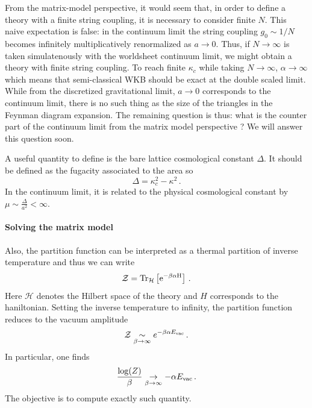 \documentclass[a4paper]{article}
\begin{document}
From the matrix-model perspective, it would seem that, in order to define a theory with a finite string coupling, it is necessary to consider finite $N$. This naive expectation is false: in the continuum limit the string coupling $g_0\sim 1/N$ becomes infinitely multiplicatively renormalized as $a\to0$. Thus, if $N\to \infty$ is taken simulatenously with the worldsheet continuum limit, we might obtain a theory with finite string coupling. To reach finite $\kappa_c$ while taking $N\to \infty$, $\alpha\to \infty$ which means that semi-classical WKB should be exact at the double scaled limit. While from the discretized gravitational limit, $a\to0$ corresponds to the continuum limit, there is no such thing as the size of the triangles in the Feynman diagram expansion. The remaining question is thus: what is the counter part of the continuum limit from the matrix model perspective ? We will answer this question soon. 

A useful quantity to define is the bare lattice cosmological constant $\Delta$. It should be defined as the fugacity associated to the area so
\begin{equation}
  \Delta = \kappa_c^2 - \kappa^2\,.
\end{equation}
In the continuum limit, it is related to the physical cosmological constant by $\mu \sim \frac{\Delta}{a^2}<\infty$.
\paragraph{Solving the matrix model}
Also, the partition function can be interpreted as a thermal partition of inverse temperature and thus we can write
\begin{equation}
  \mathcal{Z} = \rm{Tr}_{\mathcal{H}}\left[e^{-\beta \alpha H}\right]\,.
\end{equation}  
Here $\mathcal{H}$ denotes the Hilbert space of the theory and $H$ corresponds to the haniltonian. Setting the inverse temperature to infinity, the partition function reduces to the vacuum amplitude
\begin{equation}
  \mathcal{Z} \underset{\beta\to\infty}{\sim} e^{-\beta \alpha E_{\rm vac}}\,.
\end{equation}
In particular, one finds
\begin{equation}
  \frac{\log(Z)}{\beta} \underset{\beta\to\infty}{\to} - \alpha E_{\rm vac}\,.
\end{equation}
The objective is to compute exactly such quantity.
\end{document}
